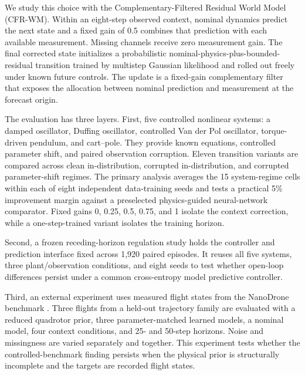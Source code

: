 \documentclass[pdflatex,sn-basic]{sn-jnl}
\newcommand{\method}{CFR-WM}
\begin{document}
We study this choice with the Complementary-Filtered Residual World Model
(\method). Within an eight-step observed context, nominal dynamics predict the
next state and a fixed gain of 0.5 combines that prediction with each available
measurement. Missing channels receive zero measurement gain. The final
corrected state initializes a probabilistic nominal-physics-plus-bounded-
residual transition trained by multistep Gaussian likelihood and rolled out
freely under known future controls. The update is a fixed-gain complementary
filter that exposes the allocation between nominal prediction and measurement
at the forecast origin.

The evaluation has three layers. First, five controlled nonlinear systems: a
damped oscillator, Duffing oscillator, controlled Van der Pol oscillator,
torque-driven pendulum, and cart--pole. They provide known equations, controlled
parameter shift, and paired observation corruption. Eleven transition variants
are compared across clean in-distribution, corrupted in-distribution, and
corrupted parameter-shift regimes. The primary analysis averages the 15
system-regime cells within each of eight independent data-training seeds and
tests a practical 5\% improvement margin against a preselected physics-guided
neural-network comparator. Fixed gains 0, 0.25, 0.5, 0.75, and 1 isolate the
context correction, while a one-step-trained variant isolates the training
horizon.

Second, a frozen receding-horizon regulation study holds the controller and prediction interface fixed across 1,920 paired episodes. It reuses all five systems, three plant/observation conditions, and eight seeds to test whether open-loop differences persist under a common cross-entropy model predictive controller.

Third, an external experiment uses measured flight states from the NanoDrone
benchmark \citep{busetto2026_nanodrone}. Three flights from a held-out
trajectory family are evaluated with a reduced quadrotor prior, three
parameter-matched learned models, a nominal model, four context conditions, and
25- and 50-step horizons. Noise and missingness are varied separately and
together. This experiment tests whether the controlled-benchmark finding
persists when the physical prior is structurally incomplete and the targets are
recorded flight states.
\end{document}

